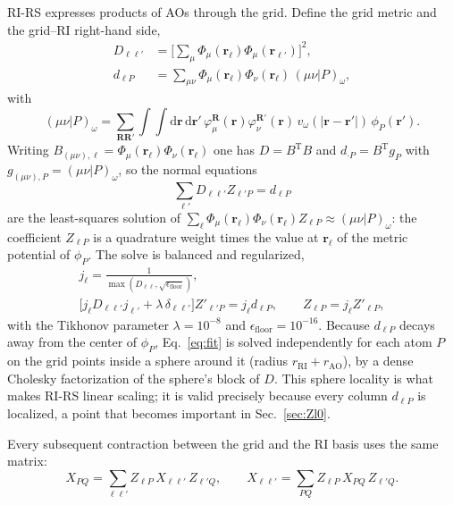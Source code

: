 \documentclass[%
 reprint,
superscriptaddress,
 amsmath,amssymb,
 aps,
prb,
]{revtex4-2}
\newcommand{\br}{\mathbf{r}}
\newcommand{\bR}{\mathbf{R}}
\newcommand{\dd}{\mathrm{d}}
\newcommand{\Tr}{\mathrm{T}}
\begin{document}
RI-RS expresses products of AOs through the grid. Define the grid metric and the grid--RI
right-hand side,
\begin{align}
  D_{\ell\ell'} &= \Big[\sum_\mu \Phi_\mu(\br_\ell)\Phi_\mu(\br_{\ell'})\Big]^2 ,
  \label{eq:D}\\
  d_{\ell P} &= \sum_{\mu\nu}\Phi_\mu(\br_\ell)\Phi_\nu(\br_\ell)\,(\mu\nu|P)_\omega ,
  \label{eq:d}
\end{align}
with
\begin{equation}
  (\mu\nu|P)_\omega = \sum_{\bR\bR'}\!\int\!\!\int\dd\br\,\dd\br'\,
  \varphi_{\mu}^{\bR}(\br)\varphi_{\nu}^{\bR'}(\br)\, v_\omega(|\br-\br'|)\,\phi_P(\br') .
  \label{eq:3c}
\end{equation}
Writing $B_{(\mu\nu),\ell} = \Phi_\mu(\br_\ell)\Phi_\nu(\br_\ell)$ one has
$D = B^\Tr B$ and $d_{\cdot P} = B^\Tr g_P$ with $g_{(\mu\nu),P} = (\mu\nu|P)_\omega$, so the
normal equations
\begin{equation}
  \sum_{\ell'} D_{\ell\ell'} Z_{\ell' P} = d_{\ell P}
  \label{eq:fit}
\end{equation}
are the least-squares solution of
$\sum_\ell \Phi_\mu(\br_\ell)\Phi_\nu(\br_\ell) Z_{\ell P}\approx (\mu\nu|P)_\omega$: the
coefficient $Z_{\ell P}$ is a quadrature weight times the value at $\br_\ell$ of the metric
potential of $\phi_P$. The solve is balanced and regularized,
\begin{equation}
\begin{gathered}
  j_\ell = \frac{1}{\max(D_{\ell\ell},\sqrt{\epsilon_\mathrm{floor}})},\\
  \big[j_\ell D_{\ell\ell'} j_{\ell'} + \lambda\,\delta_{\ell\ell'}\big] Z'_{\ell'P} = j_\ell d_{\ell P},
  \qquad Z_{\ell P} = j_\ell Z'_{\ell P},
\end{gathered}
  \label{eq:fit_reg}
\end{equation}
with the Tikhonov parameter $\lambda = 10^{-8}$ and $\epsilon_\mathrm{floor}=10^{-16}$.
Because $d_{\ell P}$ decays away from the center of $\phi_P$, Eq.~\eqref{eq:fit} is solved
independently for each atom $P$ on the grid points inside a sphere around it (radius
$r_\mathrm{RI}+r_\mathrm{AO}$), by a dense Cholesky factorization of the sphere's block of
$D$. This sphere locality is what makes RI-RS linear scaling; it is valid precisely because
every column $d_{\ell P}$ is localized, a point that becomes important in Sec.~\ref{sec:Zl0}.

Every subsequent contraction between the grid and the RI basis uses the same matrix:
\begin{equation}
  X_{PQ} = \sum_{\ell\ell'} Z_{\ell P}\, X_{\ell\ell'}\, Z_{\ell' Q},\qquad
  X_{\ell\ell'} = \sum_{PQ} Z_{\ell P}\, X_{PQ}\, Z_{\ell' Q}.
  \label{eq:ZXZ}
\end{equation}
\end{document}
